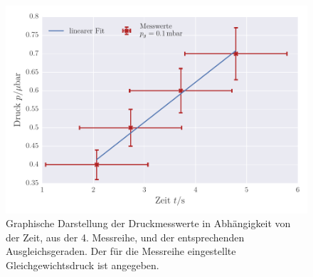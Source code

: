 \begin{figure}[!h]
 \centering
 \includegraphics[scale=0.8]{../Grafiken/Leckrate_Turbo_3.pdf}
 \caption{Graphische Darstellung der Druckmesswerte in Abhängigkeit von der Zeit, aus der 4. Messreihe, und der
 	entsprechenden Ausgleichsgeraden. Der für die Messreihe eingestellte Gleichgewichtsdruck ist angegeben. \label{fig:leckrate_turbo_3}}
 \end{figure} 